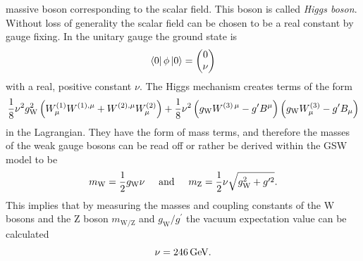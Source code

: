 massive boson corresponding to the scalar field. This boson is called \textit{Higgs boson}. 
Without loss of generality the scalar field can be chosen to be a real constant by gauge fixing. In the unitary gauge the ground state is
\begin{equation}
    \left< 0 \right|\phi\left| 0 \right> = \begin{pmatrix} 0 \\ \nu \end{pmatrix} 
\end{equation}
with a real, positive constant $\nu$.
The Higgs mechanism creates terms of the form 
\begin{equation}
    \frac{1}{8}\nu^2 g_\text{W}^2 \left( W^{\left( 1 \right)}_\mu W^{\left( 1 \right), \mu} + W^{\left( 2 \right), \mu} W^{\left( 2 \right)}_\mu \right) + \frac{1}{8} \nu^2 \left( g_\text{W} W^{\left( 3 \right)\,  \mu} - g^\prime B^\mu \right) \left( g_\text{W} W^{\left( 3 \right)}_\mu - g^\prime B_\mu \right) 
\end{equation}
in the Lagrangian. They have the form of mass terms, and therefore the masses of the weak gauge bosons can be read off or rather be derived within the GSW model to be
\begin{equation}
    m_\text{W} = \frac{1}{2}g_\text{W}\nu \hspace*{0.5cm} \text{and} \hspace*{0.5cm}  m_\text{Z} = \frac{1}{2}\nu \sqrt{g_\text{W}^2 +g^{\prime2}}.
\end{equation}   
This implies that by measuring the masses and coupling constants of the W bosons and the Z boson $m_\text{W/Z}$ and $g_\text{W}/g^\prime$ the vacuum expectation value can be calculated
\begin{equation} 
    \nu = \text{246\,{GeV}}.
\end{equation} 

